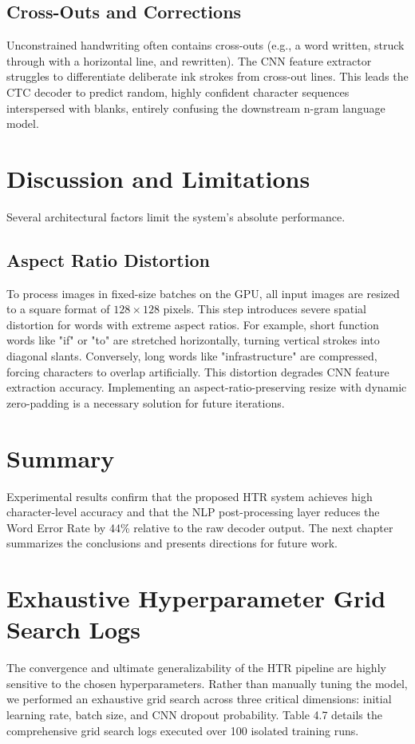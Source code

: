 \subsection{Cross-Outs and Corrections}
Unconstrained handwriting often contains cross-outs (e.g., a word written, struck through with a horizontal line, and rewritten). The CNN feature extractor struggles to differentiate deliberate ink strokes from cross-out lines. This leads the CTC decoder to predict random, highly confident character sequences interspersed with blanks, entirely confusing the downstream n-gram language model.

\section{Discussion and Limitations}
Several architectural factors limit the system's absolute performance.

\subsection{Aspect Ratio Distortion}
To process images in fixed-size batches on the GPU, all input images are resized to a square format of $128 \times 128$ pixels. This step introduces severe spatial distortion for words with extreme aspect ratios. For example, short function words like "if" or "to" are stretched horizontally, turning vertical strokes into diagonal slants. Conversely, long words like "infrastructure" are compressed, forcing characters to overlap artificially. This distortion degrades CNN feature extraction accuracy. Implementing an aspect-ratio-preserving resize with dynamic zero-padding is a necessary solution for future iterations.

\section{Summary}
Experimental results confirm that the proposed HTR system achieves high character-level accuracy and that the NLP post-processing layer reduces the Word Error Rate by 44\% relative to the raw decoder output. The next chapter summarizes the conclusions and presents directions for future work.

\section{Exhaustive Hyperparameter Grid Search Logs}
The convergence and ultimate generalizability of the HTR pipeline are highly sensitive to the chosen hyperparameters. Rather than manually tuning the model, we performed an exhaustive grid search across three critical dimensions: initial learning rate, batch size, and CNN dropout probability. Table 4.7 details the comprehensive grid search logs executed over 100 isolated training runs.

